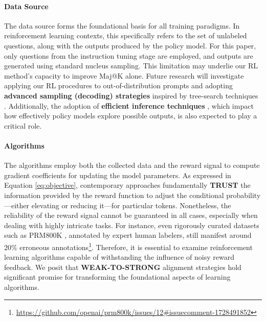 \paragraph{Data Source} The data source forms the foundational basis for all training paradigms. In reinforcement learning contexts, this specifically refers to the set of unlabeled questions, along with the outputs produced by the policy model. For this paper, only questions from the instruction tuning stage are employed, and outputs are generated using standard nucleus sampling. This limitation may underlie our RL method’s capacity to improve Maj@K alone. Future research will investigate applying our RL procedures to out-of-distribution prompts and adopting \textbf{advanced sampling (decoding) strategies} inspired by tree-search techniques \citep{yao2023tree}. Additionally, the adoption of \textbf{efficient inference techniques} \citep{xia-etal-2023-speculative,leviathan2023fast,kwon2023efficient,xia2024unlocking}, which impact how effectively policy models explore possible outputs, is also expected to play a critical role.

\paragraph{Algorithms} The algorithms employ both the collected data and the reward signal to compute gradient coefficients for updating the model parameters. As expressed in Equation \ref{eq:objective}, contemporary approaches fundamentally \textbf{TRUST} the information provided by the reward function to adjust the conditional probability—either elevating or reducing it—for particular tokens. Nonetheless, the reliability of the reward signal cannot be guaranteed in all cases, especially when dealing with highly intricate tasks. For instance, even rigorously curated datasets such as PRM800K \citep{lightman2023let}, annotated by expert human labelers, still manifest around 20\% erroneous annotations\footnote{\url{https://github.com/openai/prm800k/issues/12\#issuecomment-1728491852}}. Therefore, it is essential to examine reinforcement learning algorithms capable of withstanding the influence of noisy reward feedback. We posit that \textbf{WEAK-TO-STRONG} alignment strategies \citep{burns2023weak} hold significant promise for transforming the foundational aspects of learning algorithms.

